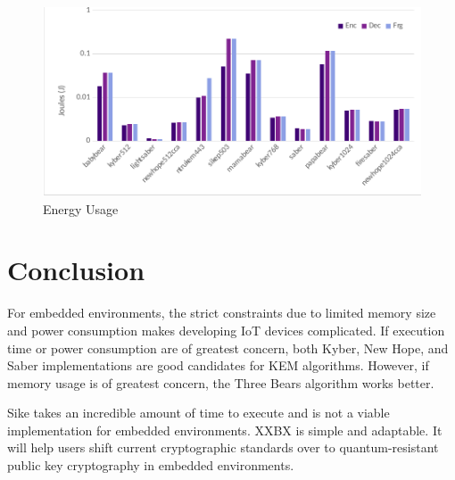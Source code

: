 \documentclass[10pt]{article}
\begin{document}
\begin{figure}[ht]
    \centering
    \includegraphics[scale=0.8]{./figures/energy.pdf}
    \caption{Energy Usage}
    \label{fig:energ}
\end{figure}




\section{Conclusion}

For embedded environments, the strict constraints due to limited memory size and power 
consumption makes developing IoT devices complicated. If execution time or power consumption 
are of greatest concern, both Kyber, New Hope, and Saber implementations are good candidates 
for KEM algorithms. However, if memory usage is of greatest concern, the Three Bears algorithm 
works better.

Sike takes an incredible amount of time to execute and is not a viable implementation for 
embedded environments.
XXBX is simple and adaptable. It will help users shift current cryptographic standards over 
to quantum-resistant public key cryptography in embedded environments.




\end{document}
